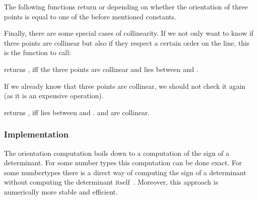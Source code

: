 \pagebreak[3]
The following functions  return  or 
depending on whether the orientation of three points is equal to
one of the before mentioned constants.





Finally, there are some special cases of collinearity. If we not only
want to know if three points are collinear but also if they respect a 
certain order on the line, this is the function to call:


         {returns , iff the three points are collinear and 
           lies between  and .}


If we already know that three points are collinear, we should not
check it again (as it is an expensive operation). 

         {returns , iff  lies between  
          and . \precond {} and  are 
	collinear.}



\subsubsection*{Implementation}

 The orientation computation boils down to a computation of the sign
of a determinant. For some number types this computation can be done
exact. For some numbertypes there is a direct way of computing the sign 
of a determinant without computing the determinant itself~\cite{ABDPY}. 
Moreover, this approach is numerically more stable and efficient.


